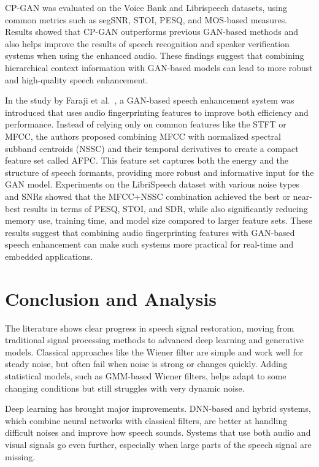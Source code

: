 CP-GAN was evaluated on the Voice Bank and Librispeech datasets, using common metrics such as segSNR, STOI, PESQ, and MOS-based measures. Results showed that CP-GAN outperforms previous GAN-based methods and also helps improve the results of speech recognition and speaker verification systems when using the enhanced audio. These findings suggest that combining hierarchical context information with GAN-based models can lead to more robust and high-quality speech enhancement.

\vspace{1em}

In the study by Faraji et al.~\cite{faraji2020afpgan}, a GAN-based speech enhancement system was introduced that uses audio fingerprinting features to improve both efficiency and performance. Instead of relying only on common features like the STFT or MFCC, the authors proposed combining MFCC with normalized spectral subband centroids (NSSC) and their temporal derivatives to create a compact feature set called AFPC. This feature set captures both the energy and the structure of speech formants, providing more robust and informative input for the GAN model. Experiments on the LibriSpeech dataset with various noise types and SNRs showed that the MFCC+NSSC combination achieved the best or near-best results in terms of PESQ, STOI, and SDR, while also significantly reducing memory use, training time, and model size compared to larger feature sets. These results suggest that combining audio fingerprinting features with GAN-based speech enhancement can make such systems more practical for real-time and embedded applications.


\section{Conclusion and Analysis}

The literature shows clear progress in speech signal restoration, moving from traditional signal processing methods to advanced deep learning and generative models. Classical approaches like the Wiener filter are simple and work well for steady noise, but often fail when noise is strong or changes quickly. Adding statistical models, such as GMM-based Wiener filters, helps adapt to some changing conditions but still struggles with very dynamic noise.

Deep learning has brought major improvements. DNN-based and hybrid systems, which combine neural networks with classical filters, are better at handling difficult noises and improve how speech sounds. Systems that use both audio and visual signals go even further, especially when large parts of the speech signal are missing.

